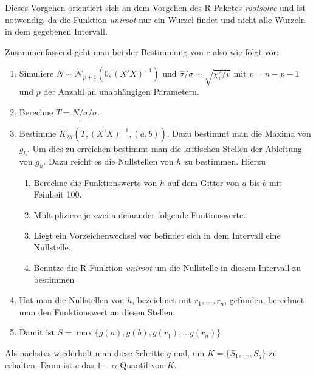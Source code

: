 \documentclass[12pt,a4paper]{article}
\theoremstyle{definition}
\theoremstyle{definition}
\theoremstyle{definition}
\newcommand{\ngridpoly}{100}
\begin{document}
Dieses Vorgehen orientiert sich an dem Vorgehen des R-Paketes \textit{rootsolve} und ist notwendig, da die Funktion \textit{uniroot} nur ein Wurzel findet und nicht alle Wurzeln in dem gegebenen Intervall.

Zusammenfassend geht man bei der Bestimmung von $c$ also wie folgt vor:

\begin{enumerate}
\item Simuliere $N \sim \mathscr{N}_{p+1}(0,(X'X)^{-1})$ und $\hat{\sigma}/\sigma \sim \sqrt{\chi^2_v /v}$ mit $v=n-p-1$ und $p$ der Anzahl an unabhängigen Parametern.
\item Berechne $T=N/\hat{\sigma}/\sigma$.
\item Bestimme $K_{2h}(T,(X'X)^{-1},(a,b))$. Dazu bestimmt man die Maxima von $g_h$. Um dies zu erreichen bestimmt man die kritischen Stellen der Ableitung von $g_h$. Dazu reicht es die Nullstellen von $h$ zu bestimmen. Hierzu
\begin{enumerate}
\item Berechne die Funktionswerte von $h$ auf dem Gitter von $a$ bis $b$ mit Feinheit \ngridpoly .
\item Multipliziere je zwei aufeinander folgende Funtionswerte.
\item Liegt ein Vorzeichenwechsel vor befindet sich in dem Intervall eine Nullstelle.
\item Benutze die R-Funktion \textit{uniroot} um die Nullstelle in diesem Intervall zu bestimmen
\end{enumerate}
\item Hat man die Nullstellen von $h$, bezeichnet mit $r_1, \ldots, r_n$, gefunden, berechnet man den Funktionswert an diesen Stellen.
\item Damit ist $S = \max\{ g(a), g(b), g(r_1), \ldots g(r_n) \}$
\end{enumerate}

Als nächstes wiederholt man diese Schritte $q$ mal, um $K= \{S_1, \ldots, S_q\}$ zu erhalten. Dann ist $c$ das $1-\alpha$-Quantil von $K$.
\end{document}
